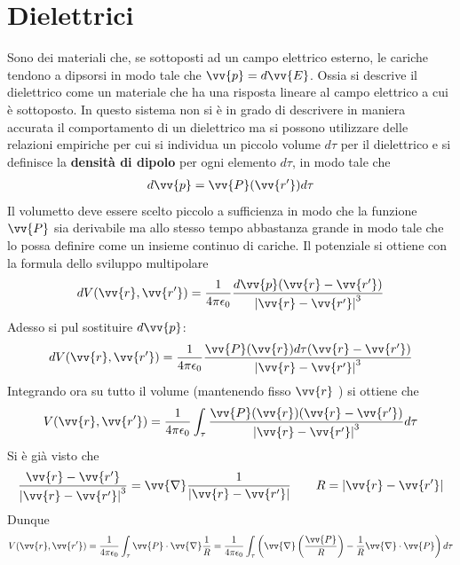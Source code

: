 \documentclass[a4paper, oneside]{article}
\begin{document}
\section{Dielettrici}
Sono dei materiali che, se sottoposti ad un campo elettrico esterno, 
le cariche tendono a dipsorsi in modo tale che $\vv{p} = d\vv{E}$. Ossia 
si descrive il dielettrico come un materiale che ha una risposta lineare 
al campo elettrico a cui è sottoposto. In questo sistema non si è in grado di 
descrivere in maniera accurata il comportamento di un dielettrico ma si possono 
utilizzare delle relazioni empiriche per cui si individua un piccolo 
volume $d\tau$ per il dielettrico e si definisce la \textbf{densità di dipolo} 
per ogni elemento $d\tau$, in modo tale che
\begin{gather*}
    d\vv{p} = \vv{P}(\vv{r'}) d\tau  
\end{gather*}  
Il volumetto deve essere scelto piccolo a sufficienza in modo che la funzione $\vv{P}$ sia derivabile 
ma allo stesso tempo abbastanza grande in modo tale che lo possa definire come un insieme 
continuo di cariche. Il potenziale si ottiene con la formula dello sviluppo multipolare
\begin{gather*}
    dV(\vv{r}, \vv{r'}  ) =  \frac{1}{4\pi\epsilon_0} \frac{d\vv{p}(\vv{r} - \vv{r'}  )}{\left| \vv{r} - \vv{r'}   \right|^{3} } 
\end{gather*}
Adesso si pul sostituire $d\vv{p}$:
\begin{gather*}
    dV(\vv{r}, \vv{r'}  ) = \frac{1}{4\pi \epsilon_0} \frac{\vv{P}(\vv{r} ) d\tau (\vv{r} - \vv{r'}  )}{\left| \vv{r} - \vv{r'}   \right|^{3} }
\end{gather*} 
Integrando ora su tutto il volume (mantenendo fisso $\vv{r}$ ) si ottiene che
\begin{gather*}
    V(\vv{r}, \vv{r'}  ) = \frac{1}{4\pi\epsilon_0} \int_{\tau}  \frac{\vv{P}(\vv{r} ) (\vv{r} - \vv{r'}  ) }{\left| \vv{r} - \vv{r'}   \right|^{3} } d\tau
\end{gather*}
Si è già visto che
\begin{gather*}
    \frac{\vv{r} - \vv{r'}  }{\left| \vv{r} - \vv{r'}   \right|^{3} } = \vv{\nabla} \frac{1}{\left| \vv{r} - \vv{r'}   \right| } \qquad R = \left| \vv{r} - \vv{r'}   \right|   
\end{gather*}
Dunque
\begin{gather*}
    V(\vv{r} ,\vv{r'}  ) = \frac{1}{4\pi\epsilon_0} \int_{\tau} \vv{P} \cdot \vv{\nabla} \frac{1}{R} = \frac{1}{4\pi\epsilon_0} \int_{\tau}\left(\vv{\nabla}\left(\frac{\vv{P} }{R}\right)  - \frac{1}{R} \vv{\nabla} \cdot \vv{P}  \right)  d\tau
\end{gather*}
\end{document}
